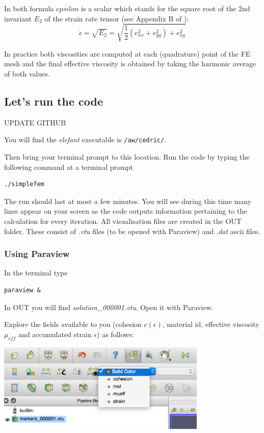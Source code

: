 \documentclass[a4paper]{article}
\begin{document}
In both formula $\dot{epsilon}$ is a scalar which stands for the square root of the 2nd invariant $E_2$ of the strain rate tensor (see Appendix B of \cite{thie11}):
\[
\dot{\epsilon}=\sqrt{E_2} = \sqrt{ \frac{1}{2}(e_{xx}^2+e_{yy}^2)+e_{xy}^2 }
\]

In practice both viscosities are computed at each (quadrature) point of the FE mesh and the final effective viscosity 
is obtained by taking the harmonic average of both values.

\subsection{Let's run the code}

{\color{red} UPDATE GITHUB}

You will find the {\sl elefant} executable is {\tt /aw/cedric/}. 

Then bring your terminal prompt to this location.
Run the code by typing the following command at a terminal prompt 
\begin{verbatim}
./simplefem
\end{verbatim}

The run should last at most a few minutes. You will see during this time many lines appear
on your screen as the code outputs information pertaining to the calculation for every iteration.
All visualisation files are created in the OUT folder. These consist of {\sl .vtu} files (to be opened with Paraview) and {\sl .dat} ascii files. 

\subsubsection{Using Paraview}

In the terminal type
\begin{verbatim}
paraview &
\end{verbatim}
In OUT you will find {\sl solution\_000001.vtu}. Open it with Paraview.

Explore the fields available to you (cohesion $c(\epsilon)$, material id, effective viscosity $\mu_{eff}$ and accumulated strain $\epsilon$) as follows:
\begin{center}
\includegraphics[width=10cm]{images/parav2}
\end{center}
\end{document}
